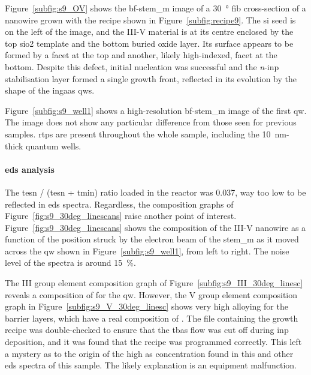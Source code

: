 Figure~\ref{subfig:s9_OV} shows the \acs{bf}-\acs{stem_m} image of a \qty{30}{\degree} \acs{fib} cross-section of a nanowire grown with the recipe shown in Figure~\ref{subfig:recipe9}. The \acl{si} seed is on the left of the image, and the III-V material is at its centre enclosed by the top \acs{sio2} template and the bottom buried oxide layer. Its surface appears to be formed by a  facet at the top and another, likely high-indexed, facet at the bottom. Despite this defect, initial nucleation was successful and the \textit{n}-\acs{inp} stabilisation layer formed a single  growth front, reflected in its evolution by the shape of the \acs{ingaas} \acl{qw}s.

Figure~\ref{subfig:s9_well1} shows a high-resolution \acs{bf}-\acs{stem_m} image of the first \acl{qw}. The image does not show any particular difference from those seen for previous samples. \Acl{rtp}s are present throughout the whole sample, including the \qty{10}{\nano\metre}-thick quantum wells.

\paragraph{\acs{eds} analysis} The \acs{tesn} / (\acs{tesn} + \acs{tmin}) ratio loaded in the reactor was \num{0.037}, way too low to be reflected in \acs{eds} spectra. Regardless, the composition graphs of Figure~\ref{fig:s9_30deg_linescans} raise another point of interest. Figure~\ref{fig:s9_30deg_linescans} shows the composition of the III-V nanowire as a function of the position struck by the electron beam of the \acs{stem_m} as it moved across the \acl{qw} shown in Figure~\ref{subfig:s9_well1}, from left to right. The noise level of the spectra is around \qty{15}{\%}.

The III group element composition graph of Figure~\ref{subfig:s9_III_30deg_linesc} reveals a composition of  for the \acl{qw}. However, the V group element composition graph in Figure~\ref{subfig:s9_V_30deg_linesc} shows very high alloying for the barrier layers, which have a real composition of . The file containing the growth recipe was double-checked to ensure that the \acs{tbas} flow was cut off during \acs{inp} deposition, and it was found that the recipe was programmed correctly. This left a mystery as to the origin of the high \acl{as} concentration found in this and other \acs{eds} spectra of this sample. The likely explanation is an equipment malfunction.

